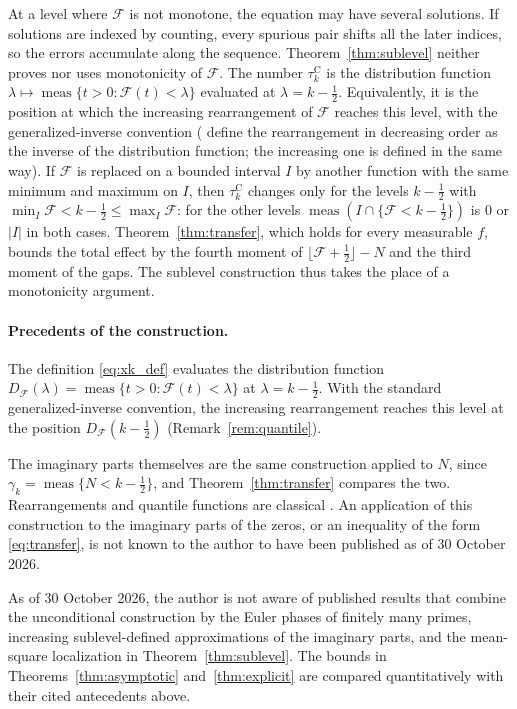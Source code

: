 \documentclass[11pt,a4paper]{article}
\makeatletter
\numberwithin{equation}{section}
\DeclareRobustCommand{\CGref}[1]{\ref{#1}}
\DeclareRobustCommand{\CGeqref}[1]{\eqref{#1}}
\DeclareRobustCommand{\CGcite}[2][]{\if\relax\detokenize{#1}\relax\cite{#2}\else\cite[#1]{#2}\fi}
\let\CG@origref\ref
\let\CG@origeqref\eqref
\newcommand{\CG@gettip}[1]{\@ifundefined{CGTip@#1}{#1}{\csname CGTip@#1\endcsname}}
\newcommand{\CG@getbib}[1]{\@ifundefined{CGBib@#1}{#1}{\csname CGBib@#1\endcsname}}
\DeclareRobustCommand{\CGref}[1]{\pdftooltip{\CG@origref{#1}}{\CG@gettip{#1}}}
\DeclareRobustCommand{\CGeqref}[1]{\pdftooltip{\CG@origeqref{#1}}{\CG@gettip{#1}}}
\DeclareRobustCommand{\CGcite}[2][]{\pdftooltip{\if\relax\detokenize{#1}\relax\cite{#2}\else\cite[#1]{#2}\fi}{\CG@getbib{#2}}}
\theoremstyle{definition}
\theoremstyle{remark}
\newcommand{\Fc}{\mathcal F}
\newcommand{\meas}{\operatorname{meas}}
\makeatother
\begin{document}
At a level where $\Fc$ is not monotone, the equation may have several solutions. If solutions are indexed by counting, every spurious pair shifts all the later indices, so the errors accumulate along the sequence. Theorem~\CGref{thm:sublevel} neither proves nor uses monotonicity of $\Fc$. The number $\tau_{k}^{\mathrm C}$ is the distribution function $\lambda\mapsto\meas\{t>0:\Fc(t)<\lambda\}$ evaluated at $\lambda=k-\frac12$. Equivalently, it is the position at which the increasing rearrangement of $\Fc$ reaches this level, with the generalized-inverse convention (\CGcite[\S10.12]{HardyLittlewoodPolya1934} define the rearrangement in decreasing order as the inverse of the distribution function; the increasing one is defined in the same way). If $\Fc$ is replaced on a bounded interval $I$ by another function with the same minimum and maximum on $I$, then $\tau_{k}^{\mathrm C}$ changes only for the levels $k-\frac12$ with $\min_I\Fc<k-\frac12\le\max_I\Fc$: for the other levels $\meas(I\cap\{\Fc<k-\frac12\})$ is $0$ or $|I|$ in both cases. Theorem~\CGref{thm:transfer}, which holds for every measurable $f$, bounds the total effect by the fourth moment of $\lfloor\Fc+\frac12\rfloor-N$ and the third moment of the gaps. The sublevel construction thus takes the place of a monotonicity argument.

\paragraph{Precedents of the construction.}
The definition \CGeqref{eq:xk_def} evaluates the distribution function $D_{\Fc}(\lambda)=\meas\{t>0:\Fc(t)<\lambda\}$ at $\lambda=k-\frac12$. With the standard generalized-inverse convention, the increasing rearrangement reaches this level at the position $D_{\Fc}(k-\frac12)$ (Remark~\CGref{rem:quantile}).

The imaginary parts themselves are the same construction applied to $N$, since $\gamma_k=\meas\{N<k-\frac12\}$, and Theorem~\CGref{thm:transfer} compares the two. Rearrangements and quantile functions are classical \CGcite[Ch.~X]{HardyLittlewoodPolya1934}. An application of this construction to the imaginary parts of the zeros, or an inequality of the form \CGeqref{eq:transfer}, is not known to the author to have been published as of 30 October 2026.

As of 30 October 2026, the author is not aware of published results that combine the unconditional construction by the Euler phases of finitely many primes, increasing sublevel-defined approximations of the imaginary parts, and the mean-square localization in Theorem~\CGref{thm:sublevel}. The bounds in Theorems~\CGref{thm:asymptotic} and~\CGref{thm:explicit} are compared quantitatively with their cited antecedents above.
\end{document}
